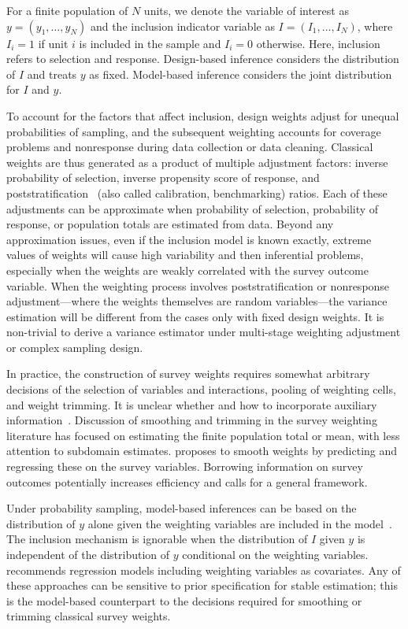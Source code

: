 \documentclass[11pt]{article}
\begin{document}
For a finite population of $N$ units, we denote the variable of interest as $y=(y_1,\dots,y_N)$ and the inclusion indicator variable as $I=(I_1,\dots,I_N)$, where $I_i=1$ if unit $i$ is included in the sample and $I_i=0$ otherwise. Here, inclusion refers to selection and response. Design-based inference considers the distribution of $I$ and treats $y$ as fixed. Model-based inference considers the joint distribution for $I$ and $y$.

To account for the factors that affect inclusion, design weights adjust for unequal probabilities of sampling, and the subsequent weighting accounts for coverage problems and nonresponse during data collection or data cleaning. Classical weights are thus generated as a product of multiple adjustment factors: inverse probability of selection, inverse propensity score of response, and poststratification~\citep{hs79} (also called calibration, benchmarking) ratios.  Each of these adjustments can be approximate when probability of selection, probability of response, or population totals are estimated from data.  Beyond any approximation issues, even if the inclusion model is known exactly, extreme values of weights will cause high variability and then inferential problems, especially when the weights are weakly correlated with the survey outcome variable. When the weighting process involves poststratification or nonresponse adjustment---where the weights themselves are random variables---the variance estimation will be different from the cases only with fixed design weights. It is non-trivial to derive a variance estimator under multi-stage weighting adjustment or complex sampling design.

In practice, the construction of survey weights requires somewhat arbitrary decisions of the selection of variables and interactions, pooling of weighting cells, and weight trimming. It is unclear whether and how to incorporate auxiliary information~\citep{groves:couper:98JOS}.  Discussion of smoothing and trimming in the survey weighting literature \cite[e.g.][]{potter88,trim-potter90,modeltrim-elliottandlittle00,elliott07,elliot:JOS16} has focused on estimating the finite population total or mean, with less attention to  subdomain estimates. \cite{beaumont08} proposes to smooth weights by predicting and regressing these on the survey variables. Borrowing information on survey outcomes potentially increases efficiency and calls for a general framework.

Under probability sampling, model-based inferences can be based on the distribution of $y$ alone given the weighting variables are included in the model~\citep{rubin76,rubin83-pi}. The inclusion mechanism is ignorable when the distribution of $I$ given $y$ is independent of the distribution of $y$ conditional on the weighting variables. \cite{gelman07} recommends regression models including weighting variables as covariates.  Any of these approaches can be sensitive to prior specification for stable estimation; this is the model-based counterpart to the decisions required for smoothing or trimming classical survey weights.
\end{document}
